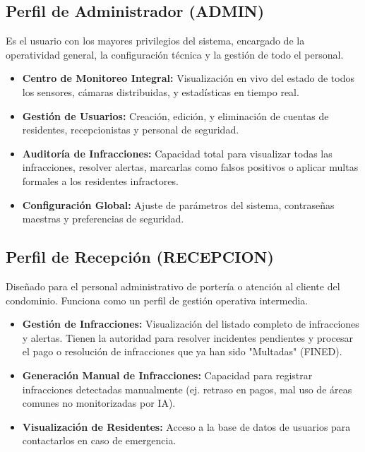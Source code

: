 \documentclass[12pt,a4paper]{article}
\begin{document}
\subsection{Perfil de Administrador (ADMIN)}
Es el usuario con los mayores privilegios del sistema, encargado de la operatividad general, la configuración técnica y la gestión de todo el personal.
\begin{itemize}
    \item \textbf{Centro de Monitoreo Integral:} Visualización en vivo del estado de todos los sensores, cámaras distribuidas, y estadísticas en tiempo real.
    \item \textbf{Gestión de Usuarios:} Creación, edición, y eliminación de cuentas de residentes, recepcionistas y personal de seguridad.
    \item \textbf{Auditoría de Infracciones:} Capacidad total para visualizar todas las infracciones, resolver alertas, marcarlas como falsos positivos o aplicar multas formales a los residentes infractores.
    \item \textbf{Configuración Global:} Ajuste de parámetros del sistema, contraseñas maestras y preferencias de seguridad.
\end{itemize}

\subsection{Perfil de Recepción (RECEPCION)}
Diseñado para el personal administrativo de portería o atención al cliente del condominio. Funciona como un perfil de gestión operativa intermedia.
\begin{itemize}
    \item \textbf{Gestión de Infracciones:} Visualización del listado completo de infracciones y alertas. Tienen la autoridad para resolver incidentes pendientes y procesar el pago o resolución de infracciones que ya han sido "Multadas" (FINED).
    \item \textbf{Generación Manual de Infracciones:} Capacidad para registrar infracciones detectadas manualmente (ej. retraso en pagos, mal uso de áreas comunes no monitorizadas por IA).
    \item \textbf{Visualización de Residentes:} Acceso a la base de datos de usuarios para contactarlos en caso de emergencia.
\end{itemize}
\end{document}
